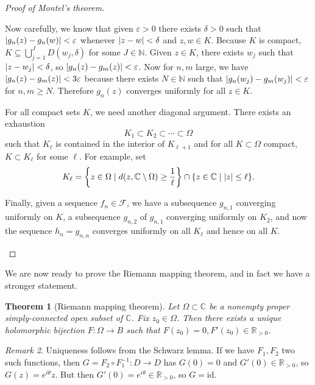 \documentclass[leqno, openany]{memoir}
\newtheorem{thm}{Theorem}[section]
\theoremstyle{definition}
\theoremstyle{remark}
\newtheorem{rmk}[thm]{Remark}
\theoremstyle{plain}
\theoremstyle{definition}
\theoremstyle{remark}
\newcommand{\R}{\mathbb{R}}
\newcommand{\C}{\mathbb{C}}
\newcommand{\N}{\mathbb{N}}
\newcommand{\ep}{\varepsilon}
\newcommand{\mc}[1]{\mathcal{#1}}
\newcommand{\mr}[1]{\mathrm{#1}}
\begin{document}
\begin{proof}[Proof of Montel's theorem]
\begin{enumerate}
            Now carefully, we know that given $\ep > 0$ there exists $\delta >
            0$ such that $\abs{g_n(z) - g_n(w)} < \ep$ whenever $\abs{z-w} <
            \delta$ and $z,w \in K$. Because $K$ is compact, $K \subseteq
            \bigcup_{j=1}^J D(w_j, \delta)$ for some $J \in \N$. Given $z \in
            K$, there exists $w_j$ such that $\abs{z-w_j} < \delta$, so
            $\abs{g_n(z) - g_m(z)} < \ep$. Now for $n,m$ large, we have
            $\abs{g_n(z) - g_m(z)} < 3 \ep$ because there exists $N \in \N$
            such that $\abs{g_n(w_j) - g_m(w_j)} < \ep$ for $n,m \geq N$.
            Therefore $g_n(z)$ converges uniformly for all $z \in K$.

            For all compact sets $K$, we need another diagonal argument. There
            exists an exhaustion \[ K_1 \subset K_2 \subset \cdots \subset
            \Omega \] such that $K_{\ell}$ is contained in the interior of
            $K_{\ell + 1}$ and for all $K \subset \Omega$ compact, $K \subset
            K_{\ell}$ for some $\ell$. For example, set \[ K_{\ell} = \qty{z
            \in \Omega \mid d(z, \C \setminus \Omega) \geq \frac{1}{\ell}} \cap
        \qty{z \in \C \mid \abs{z} \leq \ell}. \]

            Finally, given a sequence $f_n \in \mc{F}$, we have a subsequence
    $g_{n,1}$ converging uniformly on $K$, a subsequence $g_{n,2}$ of $g_{n,1}$
    converging uniformly on $K_2$, and now the sequence $h_n = g_{n,n}$
    converges uniformly on all $K_{\ell}$ and hence on all $K$. \qedhere
    \end{enumerate} \end{proof}

We are now ready to prove the Riemann mapping theorem, and in fact we have a
stronger statement.

\begin{thm}[Riemann mapping theorem] Let $\Omega \subset \C$ be a nonempty
    proper simply-connected open subset of $\C$. Fix $z_0 \in \Omega$. Then
    there exists a unique holomorphic bijection $F \colon \Omega \to B$ such
    that $F(z_0) = 0, F'(z_0) \in \R_{>0}$.  \end{thm}

\begin{rmk} Uniqueness follows from the Schwarz lemma. If we have $F_1, F_2$
    two such functions, then $G = F_2 \circ F_1^{-1} \colon D \to D$ has $G(0)
    = 0$ and $G'(0) \in \R_{>0}$, so $G(z) = e^{i\theta} z$. But then $G'(0) =
    e^{i \theta} \in \R_{>0}$, so $G = \mr{id}$.  \end{rmk}
\end{document}
